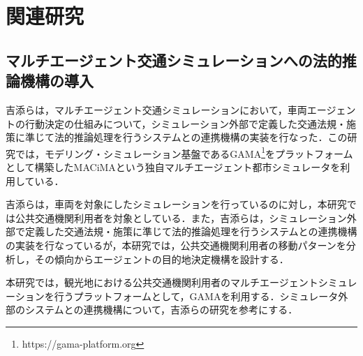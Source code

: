 \section{関連研究}
\subsection{マルチエージェント交通シミュレーションへの法的推論機構の導入}
吉添らは，マルチエージェント交通シミュレーションにおいて，車両エージェントの行動決定の仕組みについて，シミュレーション外部で定義した交通法規・施策に準じて法的推論処理を行うシステムとの連携機構の実装を行なった\cite{yoshizoe2023}．この研究では，モデリング・シミュレーション基盤であるGAMA\footnote{https://gama-platform.org}をプラットフォームとして構築したMACiMAという独自マルチエージェント都市シミュレータを利用している．

吉添らは，車両を対象にしたシミュレーションを行っているのに対し，本研究では公共交通機関利用者を対象としている．また，吉添らは，シミュレーション外部で定義した交通法規・施策に準じて法的推論処理を行うシステムとの連携機構の実装を行なっているが，本研究では，公共交通機関利用者の移動パターンを分析し，その傾向からエージェントの目的地決定機構を設計する．

本研究では，観光地における公共交通機関利用者のマルチエージェントシミュレーションを行うプラットフォームとして，GAMAを利用する．シミュレータ外部のシステムとの連携機構について，吉添らの研究を参考にする．
